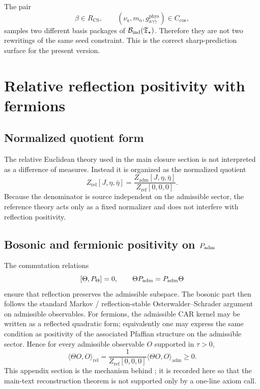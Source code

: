 \begin{remark}
The pair
\[
\beta\in R_{\mathrm{CS}},
\qquad
(\nu_a,m_a,g_{a\gamma\gamma}^{\mathrm{phys}})\in C_{\mathrm{cos}},
\]
samples two different basis packages of $\mathcal B_{\mathrm{ind}}(\mathfrak T_{\star})$. Therefore they are not two rewritings of
the same seed constraint. This is the correct sharp-prediction surface for the present version.
\end{remark}


\section{Relative reflection positivity with fermions}
\label{app:os-fermions}

\subsection{Normalized quotient form}

The relative Euclidean theory used in the main closure section is not interpreted as a difference of measures. Instead it is organized as the normalized quotient
\[
Z_{\mathrm{rel}}[J,\eta,\bar\eta]
=
\frac{Z_{\mathrm{adm}}[J,\eta,\bar\eta]}{Z_{\mathrm{ref}}[0,0,0]}.
\]
Because the denominator is source independent on the admissible sector, the reference theory acts only as a fixed normalizer and does not interfere with reflection positivity.

\subsection{Bosonic and fermionic positivity on \texorpdfstring{$P_{\mathrm{adm}}$}{Padm}}

The commutation relations
\[
[\Theta,P_\Theta]=0,
\qquad
\Theta P_{\mathrm{adm}}=P_{\mathrm{adm}}\Theta
\]
ensure that reflection preserves the admissible subspace. The bosonic part then follows the standard Markov / reflection-stable Osterwalder--Schrader argument on admissible observables. For fermions, the admissible CAR kernel may be written as a reflected quadratic form; equivalently one may express the same condition as positivity of the associated Pfaffian structure on the admissible sector. Hence for every admissible observable $O$ supported in $\tau>0$,
\[
\langle \Theta O,O\rangle_{\mathrm{rel}}
=
\frac{1}{Z_{\mathrm{ref}}[0,0,0]}
\langle \Theta O,O\rangle_{\mathrm{adm}}
\ge 0.
\]
This appendix section is the mechanism behind ; it is recorded here so that the main-text reconstruction theorem is not supported only by a one-line axiom call.

